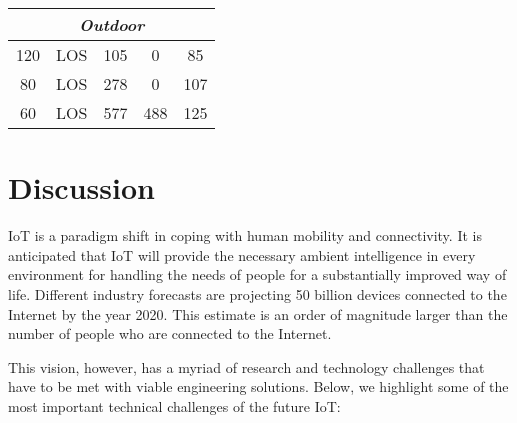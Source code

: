 \documentclass[12pt, draftclsnofoot, onecolumn]{IEEEtran}
\begin{document}
\begin{table}[]
\begin{tabular}{|c|c|c|c|c|}
		\multicolumn{5}{|c|}{\textit{Outdoor}}                                                                                                                                                                                                                                                                                        \\ \hline
		120                                                                  & LOS            & 105                                                                       & 0                                                                           & 85                                                                          \\ \hline
		80                                                                   & LOS            & 278                                                                       & 0                                                                           & 107                                                                         \\ \hline
		60                                                                   & LOS            & 577                                                                       & 488                                                                         & 125                                                                         \\ \hline
	\end{tabular}
\end{table}

\section{Discussion}
\label{sec:discussion}

IoT is a paradigm shift in coping with human mobility and connectivity. It is anticipated that IoT will provide the necessary ambient intelligence in every environment for handling the needs of people for a substantially improved way of life. Different industry forecasts are projecting 50 billion devices connected to the Internet by the year 2020. This estimate is an order of magnitude larger than the number of people who are connected to the Internet.

This vision, however, has a myriad of research and technology challenges that have to be met with viable engineering solutions. Below, we highlight some of the most important technical challenges of the future IoT:
\end{document}
